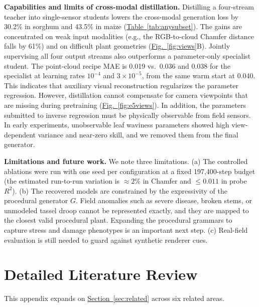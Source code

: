 \documentclass[10pt,twocolumn,letterpaper]{article}
\newcommand{\figref}[1]{\hyperref[#1]{Fig.~\ref*{#1}}}
\newcommand{\tabref}[1]{\hyperref[#1]{Table~\ref*{#1}}}
\newcommand{\Secref}[1]{\hyperref[#1]{Section~\ref*{#1}}}
\begin{document}
\noindent\textbf{Capabilities and limits of cross-modal distillation.}
Distilling a four-stream teacher into single-sensor students lowers the cross-modal generation loss by 30.2\% in sorghum and 43.5\% in maize (\tabref{tab:anysubset}). The gains are concentrated on weak input modalities (e.g., the RGB-to-cloud Chamfer distance falls by 61\%) and on difficult plant geometries (\figref{fig:views}B). Jointly supervising all four output streams also outperforms a parameter-only specialist student. The point-cloud recipe MAE is 0.019 vs.\ 0.036 and 0.038 for the specialist at learning rates $10^{-4}$ and $3 \times 10^{-5}$, from the same warm start at 0.040. This indicates that auxiliary visual reconstruction regularizes the parameter regression. However, distillation cannot compensate for camera viewpoints that are missing during pretraining (\figref{fig:e5views}). In addition, the parameters submitted to inverse regression must be physically observable from field sensors. In early experiments, unobservable leaf waviness parameters showed high view-dependent variance and near-zero skill, and we removed them from the final generator.

\noindent\textbf{Limitations and future work.}
We note three limitations. (a) The controlled ablations were run with one seed per configuration at a fixed 197{,}400-step budget (the estimated run-to-run variation is $\approx 2\%$ in Chamfer and $\le 0.011$ in probe $R^2$). (b) The recovered models are constrained by the expressivity of the procedural generator $G$. Field anomalies such as severe disease, broken stems, or unmodeled tassel droop cannot be represented exactly, and they are mapped to the closest valid procedural plant. Expanding the procedural grammars to capture stress and damage phenotypes is an important next step. (c) Real-field evaluation is still needed to guard against synthetic renderer cues.

\section{Detailed Literature Review}
\label{app:litreview}

This appendix expands on \Secref{sec:related} across six related areas.
\end{document}
